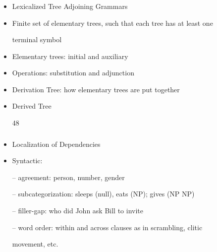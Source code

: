 \documentclass[compress,color=usenames]{beamer}
\begin{document}
\begin{frame}
\frametitle{}

\begin{itemize}
\item

Lexicalized Tree Adjoining Grammars





\item Finite set of elementary trees, such that each tree has at least one


terminal symbol





\item Elementary trees: initial and auxiliary





\item Operations: substitution and adjunction





\item Derivation Tree: how elementary trees are put together





\item Derived Tree


48




\end{itemize}

\end{frame}

\begin{frame}
\frametitle{}

\begin{itemize}
\item

Localization of Dependencies





\item Syntactic:


-- agreement: person, number, gender


-- subcategorization: sleeps (null), eats (NP); gives (NP NP)


-- ﬁller-gap: who did John ask Bill to invite


-- word order: within and across clauses as in scrambling, clitic


movement, etc.
\end{itemize}
\end{frame}
\end{document}
